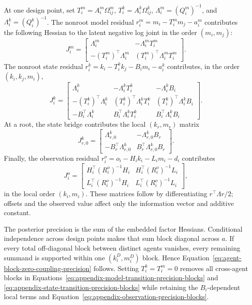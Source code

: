 At one design point, set \(T_i^m=A_i^m\Omega_{ij}^m\), \(T_i^k=A_i^k\Omega_{ij}^k\), \(\Lambda_i^m=(Q_i^m)^{-1}\), and \(\Lambda_i^k=(Q_i^k)^{-1}\). The nonroot model residual \(r_i^m=m_i-T_i^m m_j-a_i^m\) contributes the following Hessian to the latent negative log joint in the order \((m_i,m_j)\):
\begin{equation}
J_i^m=
\begin{bmatrix}
\Lambda_i^m&-\Lambda_i^mT_i^m\\
-(T_i^m)^\top\Lambda_i^m&(T_i^m)^\top\Lambda_i^mT_i^m
\end{bmatrix}.
\label{eq:appendix-model-transition-precision-blocks}
\end{equation}
The nonroot state residual \(r_i^k=k_i-T_i^k k_j-B_i m_i-a_i^k\) contributes, in the order \((k_i,k_j,m_i)\),
\begin{equation}
J_i^k=
\begin{bmatrix}
\Lambda_i^k&-\Lambda_i^kT_i^k&-\Lambda_i^kB_i\\
-(T_i^k)^\top\Lambda_i^k&(T_i^k)^\top\Lambda_i^kT_i^k&(T_i^k)^\top\Lambda_i^kB_i\\
-B_i^\top\Lambda_i^k&B_i^\top\Lambda_i^kT_i^k&B_i^\top\Lambda_i^kB_i
\end{bmatrix}.
\label{eq:appendix-state-transition-precision-blocks}
\end{equation}
At a root, the state bridge contributes the local \((k_r,m_r)\) matrix
\begin{equation}
J_{r,0}^k=
\begin{bmatrix}
\Lambda_{r,0}^k&-\Lambda_{r,0}^kB_r\\
-B_r^\top\Lambda_{r,0}^k&B_r^\top\Lambda_{r,0}^kB_r
\end{bmatrix}.
\label{eq:appendix-root-bridge-precision-blocks}
\end{equation}
Finally, the observation residual \(r_i^o=o_i-H_i k_i-L_i m_i-d_i\) contributes
\begin{equation}
J_i^o=
\begin{bmatrix}
H_i^\top(R_i^o)^{-1}H_i&H_i^\top(R_i^o)^{-1}L_i\\
L_i^\top(R_i^o)^{-1}H_i&L_i^\top(R_i^o)^{-1}L_i
\end{bmatrix},
\label{eq:appendix-observation-precision-blocks}
\end{equation}
in the local order \((k_i,m_i)\). These matrices follow by differentiating \(r^\top\Lambda r/2\); offsets and the observed value affect only the information vector and additive constant.

The posterior precision is the sum of the embedded factor Hessians. Conditional independence across design points makes that sum block diagonal across \(a\). If every total off-diagonal block between distinct agents vanishes, every remaining summand is supported within one \((k_i^D,m_i^D)\) block. Hence Equation~\eqref{eq:agent-block-zero-coupling-precision} follows. Setting \(T_i^k=T_i^m=0\) removes all cross-agent blocks in Equations~\eqref{eq:appendix-model-transition-precision-blocks} and \eqref{eq:appendix-state-transition-precision-blocks} while retaining the \(B_i\)-dependent local terms and Equation~\eqref{eq:appendix-observation-precision-blocks}.

